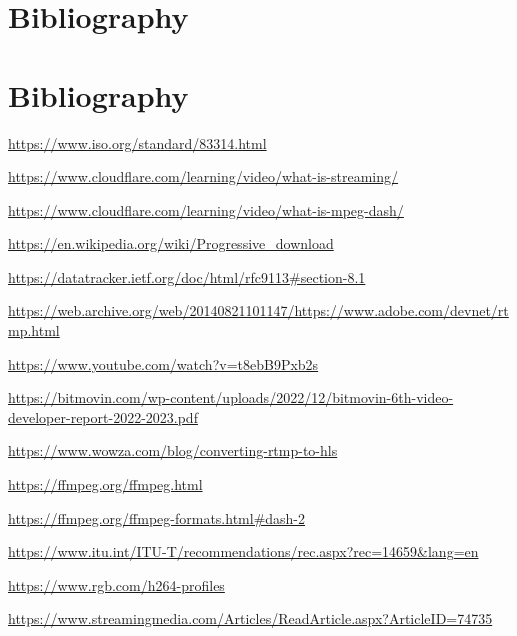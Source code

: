 \documentclass{article}
\begin{document}
\section*{Bibliography}

\section*{Bibliography}

\begin{thebibliography}{}

\item \url{https://www.iso.org/standard/83314.html}

\item \url{https://www.cloudflare.com/learning/video/what-is-streaming/}

\item \url{https://www.cloudflare.com/learning/video/what-is-mpeg-dash/}

\item \url{https://en.wikipedia.org/wiki/Progressive_download}

\item \url{https://datatracker.ietf.org/doc/html/rfc9113#section-8.1}

\item \url{https://web.archive.org/web/20140821101147/https://www.adobe.com/devnet/rtmp.html}

\item \url{https://www.youtube.com/watch?v=t8ebB9Pxb2s}

\item \url{https://bitmovin.com/wp-content/uploads/2022/12/bitmovin-6th-video-developer-report-2022-2023.pdf}

\item \url{https://www.wowza.com/blog/converting-rtmp-to-hls}

\item \url{https://ffmpeg.org/ffmpeg.html}

\item \url{https://ffmpeg.org/ffmpeg-formats.html#dash-2}

\item \url{https://www.itu.int/ITU-T/recommendations/rec.aspx?rec=14659&lang=en}

\item \url{https://www.rgb.com/h264-profiles}

\item \url{https://www.streamingmedia.com/Articles/ReadArticle.aspx?ArticleID=74735}


\end{thebibliography}
\end{document}
